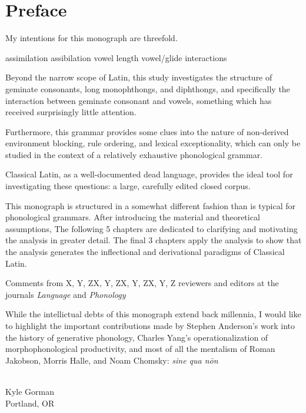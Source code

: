 \chapter*{Preface}

My intentions for this monograph are threefold.

assimilation
assibilation
vowel length
vowel/glide interactions

Beyond the narrow scope of Latin, this study investigates the structure of geminate consonants, long monophthongs, and diphthongs, and specifically the interaction between geminate consonant and vowels, something which has received surprisingly little attention.

Furthermore, this grammar provides some clues into the nature of non-derived environment blocking, rule ordering, and lexical exceptionality, which can only be studied in the context of a relatively exhaustive phonological grammar.

Classical Latin, as a well-documented dead language, provides the ideal tool for investigating these questions: a large, carefully edited closed corpus.

This monograph is structured in a somewhat different fashion than is typical for phonological grammars.
After introducing the material and theoretical assumptions,
The following 5 chapters are dedicated to clarifying and motivating the analysis in greater detail.
The final 3 chapters apply the analysis to show that the analysis generates the inflectional and derivational paradigms of Classical Latin.

Comments from X, Y, ZX, Y, ZX, Y, ZX, Y, Z
reviewers and editors at the journals \emph{Language} and \emph{Phonology}

While the intellictual debts of this monograph extend back millennia, I would like to highlight the important contributions made by Stephen Anderson's work into the history of generative phonology, Charles Yang's operationalization of morphophonological productivity, and most of all the mentalism of Roman Jakobson, Morris Halle, and Noam Chomsky: \emph{sine qua nōn}

\noindent \\
Kyle Gorman \\
Portland, OR
